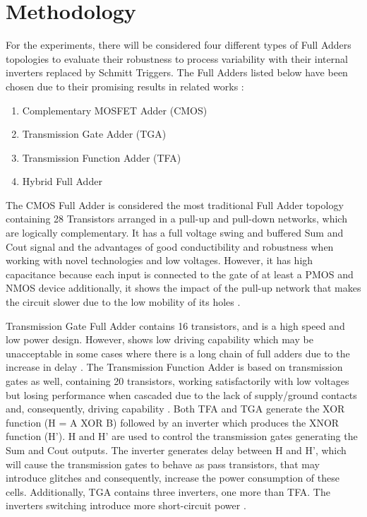 \documentclass[ecp,tc, english]{iiufrgs}
\begin{document}
\chapter{Methodology}

For the experiments, there will be considered four different types of Full Adders topologies to evaluate their robustness to process variability with their internal inverters replaced by Schmitt Triggers. The Full Adders listed below have been chosen due to their promising results in related works \cite{ames2016investigating} \cite{dokania2015circuit} \cite{dokania2013investigation}:

\begin{enumerate}
    \item Complementary MOSFET Adder (CMOS)
    \item Transmission Gate Adder (TGA)
    \item Transmission Function Adder (TFA)
    \item Hybrid Full Adder
\end{enumerate}

The CMOS Full Adder is considered the most traditional Full Adder topology containing 28 Transistors arranged in a pull-up and pull-down networks, which are logically complementary. It has a full voltage swing and buffered Sum and Cout signal and the advantages of good conductibility and robustness when working with novel technologies and low voltages. However, it has high capacitance because each input is connected to the gate of at least a PMOS and NMOS device additionally, it shows the impact of the pull-up network that makes the circuit slower due to the low mobility of its holes \cite{beckett2002fine} \cite{devadas2017design} \cite{islam2011design}. 

Transmission Gate Full Adder \cite{weste1985principles} contains 16 transistors, and is a high speed and low power design. However, shows low driving capability which may be unacceptable in some cases where there is a long chain of full adders due to the increase in delay \cite{islam2011design}. The Transmission Function Adder is based on transmission gates as well, containing 20 transistors, working satisfactorily with low voltages but losing performance when cascaded due to the lack of supply/ground contacts and, consequently, driving capability \cite{navi2009novel}. Both TFA and TGA generate the XOR function (H = A XOR B) followed by an inverter which produces the XNOR function (H’). H and H’ are used to control the transmission gates generating the Sum and Cout outputs. The inverter generates delay between H and H’, which will cause the transmission gates to behave as pass transistors, that may introduce glitches and consequently, increase the power consumption of these cells. Additionally, TGA contains three inverters, one more than TFA. The inverters switching introduce more short-circuit power \cite{shams2000novel}.
\end{document}
